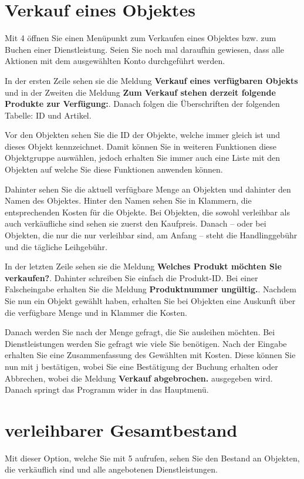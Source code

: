 ﻿\documentclass[a4paper,12pt,titlepage]{article}
\newcommand\enquote[1]{{\ttfamily \bfseries #1}}
\begin{document}
\section{Verkauf eines Objektes}
Mit 4 öffnen Sie einen Menüpunkt zum Verkaufen eines Objektes bzw. zum Buchen einer Dienstleistung.
Seien Sie noch mal daraufhin gewiesen, dass alle Aktionen mit dem ausgewählten Konto durchgeführt werden.

In der ersten Zeile sehen sie die Meldung \enquote{Verkauf eines verfügbaren Objekts}
 und in der Zweiten die Meldung \enquote{Zum Verkauf stehen derzeit folgende Produkte zur Verfügung:}.
Danach folgen die Überschriften der folgenden Tabelle: ID und Artikel.

Vor den Objekten sehen Sie die ID der Objekte, welche immer gleich ist und dieses Objekt kennzeichnet.
Damit können Sie in weiteren Funktionen diese Objektgruppe auswählen,
 jedoch erhalten Sie immer auch eine Liste mit den Objekten auf welche Sie diese Funktionen anwenden können.

Dahinter sehen Sie die aktuell verfügbare Menge an Objekten und dahinter den Namen des Objektes.
Hinter den Namen sehen Sie in Klammern, die entsprechenden Kosten für die Objekte.
Bei Objekten, die sowohl verleihbar als auch verkäufliche sind sehen sie zuerst den Kaufpreis.
Danach -- oder bei Objekten, die nur die nur verleihbar sind, am Anfang --
steht die Handlinggebühr und die tägliche Leihgebühr.

In der letzten Zeile sehen sie die Meldung \enquote{Welches Produkt möchten Sie verkaufen?}.
Dahinter schreiben Sie einfach die Produkt-ID. Bei einer Falscheingabe erhalten Sie die Meldung \enquote{Produktnummer ungültig.}.
Nachdem Sie nun ein Objekt gewählt haben,
 erhalten Sie bei Objekten eine Auskunft über die verfügbare Menge und in Klammer die Kosten.

Danach werden Sie nach der Menge gefragt, die Sie ausleihen möchten.
Bei Dienstleistungen werden Sie gefragt wie viele Sie benötigen.
Nach der Eingabe erhalten Sie eine Zusammenfassung des Gewählten mit Kosten. 
Diese können Sie nun mit j bestätigen, wobei Sie eine Bestätigung der Buchung erhalten oder Abbrechen,
 wobei die Meldung \enquote{Verkauf abgebrochen.} ausgegeben wird.
Danach springt das Programm wider in das Hauptmenü.

\section{verleihbarer Gesamtbestand}
Mit dieser Option, welche Sie mit 5 aufrufen, sehen Sie den Bestand an Objekten,
 die verkäuflich sind und alle angebotenen Dienstleistungen.
\end{document}
